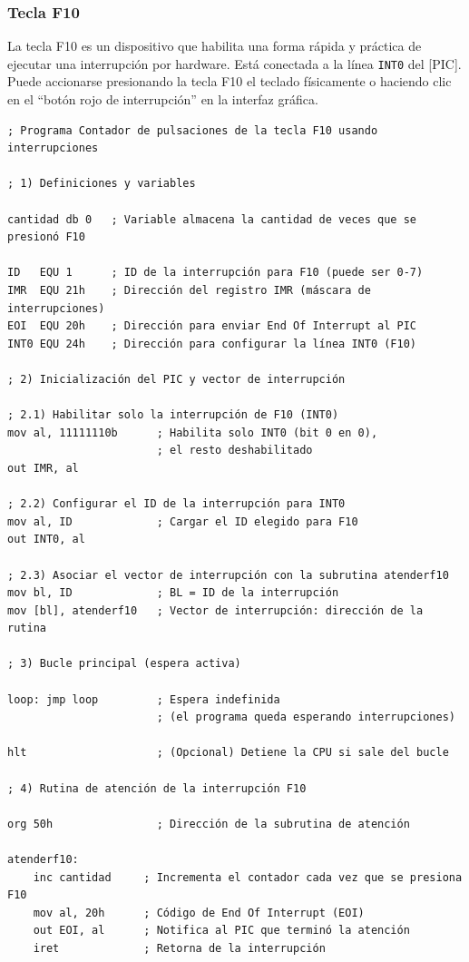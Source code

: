 \documentclass[12pt,oneside]{templates/unerthesis}
\begin{document}
\hypertarget{tecla-f10}{%
\subsubsection{Tecla F10}\label{tecla-f10}}

La tecla F10 es un dispositivo que habilita una forma rápida y práctica de ejecutar una interrupción por hardware. Está conectada a la línea \texttt{INT0} del {[}PIC{]}. Puede accionarse presionando la tecla F10 el teclado físicamente o haciendo clic en el ``botón rojo de interrupción'' en la interfaz gráfica.

\begin{lstlisting}
; Programa Contador de pulsaciones de la tecla F10 usando interrupciones

; 1) Definiciones y variables

cantidad db 0   ; Variable almacena la cantidad de veces que se presionó F10

ID   EQU 1      ; ID de la interrupción para F10 (puede ser 0-7)
IMR  EQU 21h    ; Dirección del registro IMR (máscara de interrupciones)
EOI  EQU 20h    ; Dirección para enviar End Of Interrupt al PIC
INT0 EQU 24h    ; Dirección para configurar la línea INT0 (F10)

; 2) Inicialización del PIC y vector de interrupción

; 2.1) Habilitar solo la interrupción de F10 (INT0)
mov al, 11111110b      ; Habilita solo INT0 (bit 0 en 0),
                       ; el resto deshabilitado
out IMR, al

; 2.2) Configurar el ID de la interrupción para INT0
mov al, ID             ; Cargar el ID elegido para F10
out INT0, al

; 2.3) Asociar el vector de interrupción con la subrutina atenderf10
mov bl, ID             ; BL = ID de la interrupción
mov [bl], atenderf10   ; Vector de interrupción: dirección de la rutina

; 3) Bucle principal (espera activa)

loop: jmp loop         ; Espera indefinida 
                       ; (el programa queda esperando interrupciones)

hlt                    ; (Opcional) Detiene la CPU si sale del bucle

; 4) Rutina de atención de la interrupción F10

org 50h                ; Dirección de la subrutina de atención

atenderf10:
    inc cantidad     ; Incrementa el contador cada vez que se presiona F10
    mov al, 20h      ; Código de End Of Interrupt (EOI)
    out EOI, al      ; Notifica al PIC que terminó la atención
    iret             ; Retorna de la interrupción\end{lstlisting}
\end{document}
